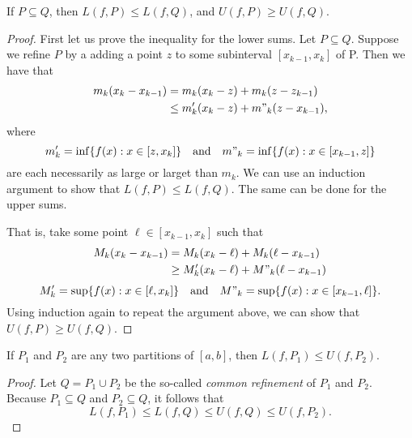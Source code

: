 \begin{tcolorbox}
\begin{lem}
If \( P \subseteq Q  \), then \( L(f,P) \leq L(f,Q)  \), and \( U(f,P ) \geq U(f,Q) \).
\end{lem}
\end{tcolorbox}

\begin{proof}
	First let us prove the inequality for the lower sums. Let \( P \subseteq Q  \). Suppose we refine \( P  \) by a adding a point \( z  \) to some subinterval \(  [x_{k-1}, x_{k }] \) of P. Then we have that 
	\begin{align*}
	    m_{k } ( x_{k } - x_{ k -1 })&= m_{  k } (x_{k } - z ) + m_{ k } (z - z _{k -1 })  \\
									 &\leq m'_{k }( x_{k } - z ) + m"_{k} (z - x_{k -1 }),
	\end{align*}
	where 
	\[  m'_{k} = \inf \{ f(x) : x \in [z, x_{k }] \} \  \ \text{ and } \  \ m"_{k} = \inf \{ f(x) : x \in [x_{k -1 }, z ] \}  \]
	are each necessarily as large or larget than \( m_k  \). We can use an induction argument to show that \(  L(f, P ) \leq L(f,Q) \). The same can be done for the upper sums.

	That is, take some point \( \ell \in [x_{k-1}, x_{k }] \) such that 
	\begin{align*}
	    M_{k } (x_{k} - x_{k -1 }) &= M_{k } (x_{ k } - \ell ) + M_{k } ( \ell - x_{k -1 }) \\
								   &\geq M_k' (x_{k } - \ell ) + M"_{k } (\ell - x_{k -1 }) \\
	\end{align*}
	\[  M'_{k} = \sup \{ f(x) : x \in [\ell, x_{k }] \} \  \ \text{ and } \  \ M"_{k}= \sup \{ f(x) : x \in [x_{k -1 }, \ell ] \}.  \]
	Using induction again to repeat the argument above, we can show that \( U(f, P) \geq U(f,Q) \).
\end{proof}

\begin{tcolorbox}
\begin{lem}
	If \( P_1  \) and \( P_2  \) are any two partitions of \( [a,b]  \), then \( L(f, P_{1}) \leq U(f, P_2) \).
\end{lem}
\end{tcolorbox}

\begin{proof}
Let \( Q = P_{1} \cup P_{2}  \) be the so-called \textit{common refinement} of \( P_{1} \) and \( P_{2} \). Because \(  P_{1} \subseteq Q  \) and \( P_{2} \subseteq Q  \), it follows that 
\[ L(f, P_{1}) \leq L(f,Q) \leq U(f,Q) \leq U(f, P_{2}).  \]
\end{proof}


